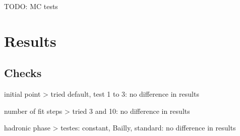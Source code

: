 \> TODO: MC tests


\chapter[results]{Results}

\section[results-checks]{Checks}

\> initial point
\>> tried default, test 1 to 3: no difference in results

\> number of fit steps
\>> tried 3 and 10: no difference in results

\> hadronic phase
\>> testes: constant, Bailly, standard: no difference in results




\EndText
\bye
